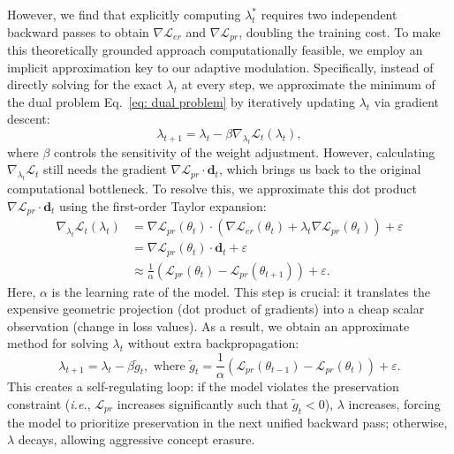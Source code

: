 However, we find that explicitly computing $\lambda_t^*$ requires two independent backward passes to obtain $\nabla \mathcal{L}_{er}$ and $\nabla \mathcal{L}_{pr}$, doubling the training cost. To make this theoretically grounded approach computationally feasible, we employ an implicit approximation key to our adaptive modulation. 
Specifically, instead of directly solving for the exact $\lambda_t$ at every step, we approximate the minimum of the dual problem Eq.~\ref{eq: dual problem} by iteratively updating $\lambda_t$ via gradient descent:
\begin{equation}
\label{eq: iteratively update lambda t via gradient descent approximation}
    \lambda_{t+1} = \lambda_t - \beta \nabla_{\lambda_{t}} \mathcal{L}_{t}(\lambda_t),
\end{equation}
where $\beta$ controls the sensitivity of the weight adjustment. However, calculating $\nabla_{\lambda_{t}} \mathcal{L}_{t}$ still needs the gradient $\nabla \mathcal{L}_{pr} \cdot \mathbf{d}_t$, which brings us back to the original computational bottleneck. To resolve this, we approximate this dot product $\nabla \mathcal{L}_{pr} \cdot \mathbf{d}_t$ using the first-order Taylor expansion: 
\begin{align}
\nabla_{\lambda_{t}} \mathcal{L}_{t}(\lambda_t) & = \nabla \mathcal{L}_{pr}(\theta_t) \cdot (\nabla \mathcal{L}_{er}(\theta_t) + \lambda_t \nabla \mathcal{L}_{pr}(\theta_t)) + \varepsilon \nonumber \\
& = \nabla \mathcal{L}_{pr}(\theta_t) \cdot \mathbf{d}_t + \varepsilon \nonumber \\
& \approx \frac{1}{\alpha} \left( \mathcal{L}_{pr}(\theta_t) - \mathcal{L}_{pr}(\theta_{t+1}) \right) + \varepsilon. \label{first-order Taylor expansion}
\end{align}
Here, $\alpha$ is the learning rate of the model. This step is crucial: it translates the expensive geometric projection (dot product of gradients) into a cheap scalar observation (change in loss values). As a result, we obtain an approximate method for solving $\lambda_t$ without extra backpropagation:
\begin{equation}
    \lambda_{t+1} = \lambda_t - \beta \tilde{g}_t, \,\, \text{where } \tilde{g}_t = \frac{1}{\alpha} \left( \mathcal{L}_{pr}(\theta_{t-1}) - \mathcal{L}_{pr}(\theta_{t}) \right) + \varepsilon.
\end{equation}
This creates a self-regulating loop: if the model violates the preservation constraint (\textit{i.e.}, $\mathcal{L}_{pr}$ increases significantly such that $\tilde{g}_t < 0$), $\lambda$ increases, forcing the model to prioritize preservation in the next unified backward pass; otherwise, $\lambda$ decays, allowing aggressive concept erasure.






